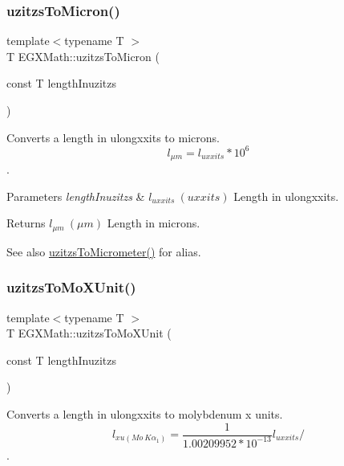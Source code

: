 \subsubsection{\texorpdfstring{uzitzs\+To\+Micron()}{uzitzsToMicron()}}
{\footnotesize\ttfamily template$<$typename T $>$ \\
T E\+G\+X\+Math\+::uzitzs\+To\+Micron (\begin{DoxyParamCaption}\item[{const T}]{length\+Inuzitzs }\end{DoxyParamCaption})}



Converts a length in ulongxxits to microns. \[ l_{\mu m}=l_{uxxits} * 10^{6} \]. 


\begin{DoxyParams}{Parameters}
{\em length\+Inuzitzs} & $ l_{uxxits}\ (uxxits)$ Length in ulongxxits. \\
\hline
\end{DoxyParams}
\begin{DoxyReturn}{Returns}
$ l_{\mu m}\ (\mu m)$ Length in microns. 
\end{DoxyReturn}
\begin{DoxySeeAlso}{See also}
\mbox{\hyperlink{group___e_g_x_math-_conversions-_length_conversions-uzitzs-_s_i_ga0bd484a80b8b66cd5272bbbc1fe6b642}{uzitzs\+To\+Micrometer()}} for alias. 
\end{DoxySeeAlso}
\mbox{\label{group___e_g_x_math-_conversions-_length_conversions-uzitzs-_non-_s_i_ga64b556911b0bb06cf315aa02f5e2d379}} 
\subsubsection{\texorpdfstring{uzitzs\+To\+Mo\+X\+Unit()}{uzitzsToMoXUnit()}}
{\footnotesize\ttfamily template$<$typename T $>$ \\
T E\+G\+X\+Math\+::uzitzs\+To\+Mo\+X\+Unit (\begin{DoxyParamCaption}\item[{const T}]{length\+Inuzitzs }\end{DoxyParamCaption})}



Converts a length in ulongxxits to molybdenum x units. \[ l_{xu(Mo\ K\alpha_1)}=\frac{1}{1.00209952*10^{-13}} l_{uxxits} / \]. 


